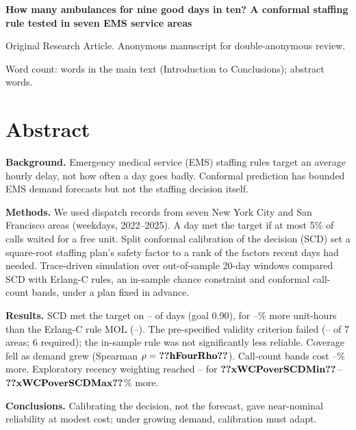 \documentclass[12pt]{article}
\begin{document}
\linenumbers

\begin{center}
{\Large\bfseries How many ambulances for nine good days in ten? A conformal staffing rule tested in seven EMS service areas\par}
\medskip
{\normalsize Original Research Article. Anonymous manuscript for double-anonymous review.\par}
{\normalsize Word count: \wcMain{} words in the main text (Introduction to Conclusions); abstract \wcAbs{} words.\par}
\end{center}

\section*{Abstract}
\noindent\textbf{Background.} Emergency medical service (EMS) staffing rules target an average hourly delay, not how often a day goes badly. Conformal prediction has bounded EMS demand forecasts but not the staffing decision itself.

\noindent\textbf{Methods.} We used  dispatch records from seven New York City and San Francisco areas (weekdays, 2022--2025). A day met the target if at most 5\% of calls waited for a free unit. Split conformal calibration of the decision (SCD) set a square-root staffing plan's safety factor to a rank of the factors recent days had needed. Trace-driven simulation over  out-of-sample 20-day windows compared SCD with Erlang-C rules, an in-sample chance constraint and conformal call-count bands, under a plan fixed in advance.

\noindent\textbf{Results.} SCD met the target on -- of days (goal 0.90), for --\% more unit-hours than the Erlang-C rule MOL (--). The pre-specified validity criterion failed (-- of 7 areas; 6 required); the in-sample rule was not significantly less reliable. Coverage fell as demand grew (Spearman $\rho=\res{hFourRho}$). Call-count bands cost --\% more. Exploratory recency weighting reached -- for $\res{xWCPoverSCDMin}$--$\res{xWCPoverSCDMax}$\% more.

\noindent\textbf{Conclusions.} Calibrating the decision, not the forecast, gave near-nominal reliability at modest cost; under growing demand, calibration must adapt.
\end{document}
